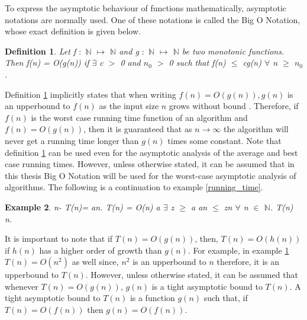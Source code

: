 \documentclass[12pt]{article}
\newtheorem{definition}{Definition}[subsection]
\newtheorem{example}[definition]{Example}
\numberwithin{equation}{subsection}
\numberwithin{table}{subsection}
\begin{document}
To express the asymptotic behaviour of functions mathematically, asymptotic notations are normally used. One of these notations is called the Big O Notation, whose exact definition is given below.
\begin{definition}
\label{bigonotation}
Let f $:$ $\mathbb{N}$ $\mapsto$ $\mathbb{N}$ and g $:$ $\mathbb{N}$ $\mapsto$ $\mathbb{N}$ be two monotonic functions. Then f(n) = O(g(n)) if $\exists$ c $>$ 0 and $n_0$ $>$ 0 such that f(n) $\leq$ cg(n) $\forall$ n $\geq$ $n_0$.  
\end{definition}
Definition \ref{bigonotation} implicitly states that when writing $\mathit{f(n) = O(g(n)), g(n)}$ is an upperbound to $\mathit{f(n)}$ as the input size $\mathit{n}$ grows without bound \cite{adamchik_2009}. Therefore, if $\mathit{f(n)}$ is the worst case running time function of an algorithm and $\mathit{f(n) = O(g(n))}$, then it is guaranteed that as $\mathit{n \rightarrow \infty}$ the algorithm will never get a running time longer than $\mathit{g(n)}$ times some constant. Note that definition \ref{bigonotation} can be used even for the asymptotic analysis of the average and best case running times. However, unless otherwise stated, it can be assumed that in this thesis Big O Notation will be used for the worst-case asymptotic analysis of algorithms. The following is a continuation to example \ref{running_time}.
\begin{example}
\label{bigonotationexample}
{} n-{} T(n)= an. {} T(n) = O(n) {} a  {} $\exists$ z $\geq$ a {} an $\leq$ zn $\forall$ n $\in$ $\mathbb{N}$. {} T(n) {} n.
\end{example}
It is important to note that if $\mathit{T(n) = O(g(n))}$, then, $\mathit{T(n) = O(h(n))}$ if $\mathit{h(n)}$ has a higher order of growth than $\mathit{g(n)}$. For example, in example \ref{bigonotation} $\mathit{T(n) = O(n^2)}$ as well since, $\mathit{n^2}$ is an upperbound to $\mathit{n}$ therefore, it is an upperbound to $\mathit{T(n)}$. However, unless otherwise stated, it can be assumed that whenever $\mathit{T(n) = O(g(n))}$, $\mathit{g(n)}$ is a tight asymptotic bound to $\mathit{T(n)}$. A tight asymptotic bound to $\mathit{T(n)}$ is a function $\mathit{g(n)}$ such that, if $\mathit{T(n)=O(f(n))}$ then $\mathit{g(n)=O(f(n))}$.\\\\
\end{document}
